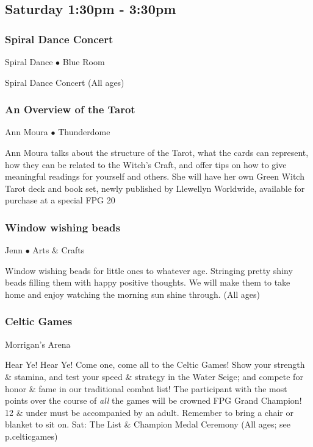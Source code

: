 \subsection{Saturday 1:30pm - 3:30pm}

\subsubsection{Spiral Dance Concert}
\label{Sat-Concert2}
{\small Spiral Dance $\bullet$  Blue Room}

 Spiral Dance Concert {\small (All ages)}

\subsubsection{An Overview of the Tarot}
\label{Sat-Moura1}
{\small Ann Moura $\bullet$  Thunderdome}

 Ann Moura talks about the structure of the Tarot, what the cards can represent, how they can be related to the Witch's Craft, and offer tips on how to give meaningful readings for yourself and others. She will have her own Green Witch Tarot deck and book set, newly published by Llewellyn Worldwide, available for purchase at a special FPG 20%

\subsubsection{Window wishing beads}
\label{Sat-Jordan1}
{\small Jenn $\bullet$  Arts \& Crafts}

 Window wishing beads for little ones to whatever age.  Stringing pretty shiny beads filling them with happy positive thoughts. We will make them to take home and enjoy watching the morning sun shine through. {\small (All ages)}

\subsubsection{Celtic Games}
\label{Sat-Celts3}
{\small  Morrigan's Arena}

 Hear Ye! Hear Ye! Come one, come all to the Celtic Games! Show your 
strength \& stamina, and test your speed \& strategy in the Water 
Seige; and compete for honor \& fame in our traditional combat list! 
 The participant with the most points over the course of \textit{all} 
the games will be crowned FPG Grand Champion! 12 \& under must be 
accompanied by an adult.  Remember to bring a chair or blanket to sit 
on. Sat: The List \& Champion Medal Ceremony  {\small (All ages; see p.{celticgames})}


